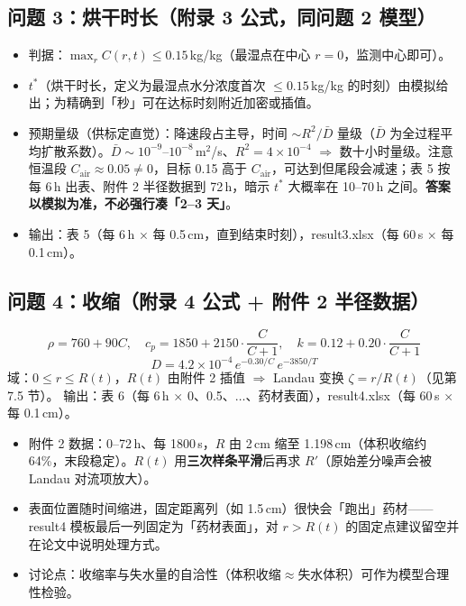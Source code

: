 \documentclass[12pt,a4paper]{ctexart}
\begin{document}
\subsection{问题 3：烘干时长（附录 3 公式，同问题 2 模型）}
\begin{itemize}
\item 判据：$\max_r C(r,t)\le0.15$\,kg/kg（最湿点在中心 $r=0$，监测中心即可）。
\item $t^*$（烘干时长，定义为最湿点水分浓度首次 $\le0.15$\,kg/kg 的时刻）由模拟给出；为精确到「秒」可在达标时刻附近加密或插值。
\item 预期量级（供标定直觉）：降速段占主导，时间 $\sim R^2/\bar{D}$ 量级（$\bar D$ 为全过程平均扩散系数）。$\bar{D}\sim10^{-9}$--$10^{-8}$\,m$^2$/s、$R^2=4\times10^{-4}$ $\Rightarrow$ 数十小时量级。注意恒温段 \textbf{$C_{\mathrm{air}}\approx0.05\neq0$}，目标 0.15 高于 $C_{\mathrm{air}}$，可达到但尾段会减速；表 5 按每 6\,h 出表、附件 2 半径数据到 72\,h，暗示 $t^*$ 大概率在 10--70\,h 之间。\textbf{答案以模拟为准，不必强行凑「2--3 天」}。
\item 输出：表 5（每 6\,h $\times$ 每 0.5\,cm，直到结束时刻），result3.xlsx（每 60\,s $\times$ 每 0.1\,cm）。
\end{itemize}

\subsection{问题 4：收缩（附录 4 公式 + 附件 2 半径数据）}
\begin{equation}
\rho=760+90C,\quad c_p=1850+2150\cdot\frac{C}{C+1},\quad k=0.12+0.20\cdot\frac{C}{C+1}
\end{equation}
\begin{equation}
D=4.2\times10^{-4}\,e^{-0.30/C}\,e^{-3850/T}
\end{equation}
域：$0\le r\le R(t)$，$R(t)$ 由附件 2 插值 $\Rightarrow$ Landau 变换 $\zeta=r/R(t)$（见第 7.5 节）。
输出：表 6（每 6\,h $\times$ 0、0.5、$\ldots$、药材表面），result4.xlsx（每 60\,s $\times$ 每 0.1\,cm）。

\begin{itemize}
\item 附件 2 数据：0--72\,h、每 1800\,s，$R$ 由 2\,cm 缩至 1.198\,cm（体积收缩约 64\%，末段稳定）。$R(t)$ 用\textbf{三次样条平滑}后再求 $R'$（原始差分噪声会被 Landau 对流项放大）。
\item 表面位置随时间缩进，固定距离列（如 1.5\,cm）很快会「跑出」药材——result4 模板最后一列固定为「药材表面」，对 $r>R(t)$ 的固定点建议留空并在论文中说明处理方式。
\item 讨论点：收缩率与失水量的自洽性（体积收缩$\approx$失水体积）可作为模型合理性检验。
\end{itemize}
\end{document}
